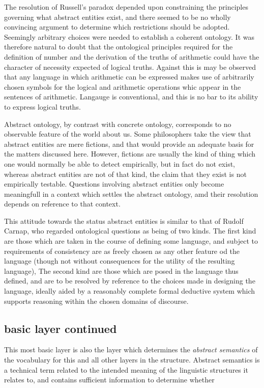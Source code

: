 \documentclass[10pt,titlepage]{book}
\begin{document}
The resolution of Russell's paradox depended upon constraining the principles governing what abstract entities exist, and there seemed to be no wholly convincing argument to determine which restrictions should be adopted.
Seemingly arbitrary choices were needed to establish a coherent ontology.
It was therefore natural to doubt that the ontological principles required for the definition of number and the derivation of the truths of arithmetic could have the character of necessity expected of logical truths.
Against this is may be observed that any language in which arithmetic can be expressed makes use of arbitrarily chosen symbols for the logical and arithmetic operations whic appear in the sentences of arithmetic.
Langauge is conventional, and this is no bar to its ability to express logical truths.

Abstract ontology, by contrast with concrete ontology, corresponds to no observable feature of the world about us.
Some philosophers take the view that abstract entities are mere fictions, and that would provide an adequate basis for the matters discussed here.
However, fictions are usually the kind of thing which one would normally be able to detect empirically, but in fact do not exist, whereas abstract entities are not of that kind, the claim that they exist is not empirically testable.
Questions involving abstract entities only become meaningfull in a context which settles the abstract ontology, amd their resolution depends on reference to that context.

This attitude towards the status abstract entities is similar to that of Rudolf Carnap, who regarded ontological questions as being of two kinds.
The first kind are those which are taken in the course of defining some language, and subject to requirements of consistency are as freely chosen as any other feature od the language (though not without consequences for the utility of the resulting language),
The second kind are those which are posed in the language thus defined, and are to be resolved by reference to the choices made in designing the language, ideally aided by a reasonably complete formal deductive system which supports reasoning within the chosen domains of discourse.

\subsection{basic layer continued}

This most basic layer is also the layer which determines the \emph{abstract semantics} of the vocabulary for this and all other layers in the structure.
Abstract semantics is a technical term related to the intended meaning of the linguistic structures it relates to, and contains sufficient information to determine whether
\end{document}
